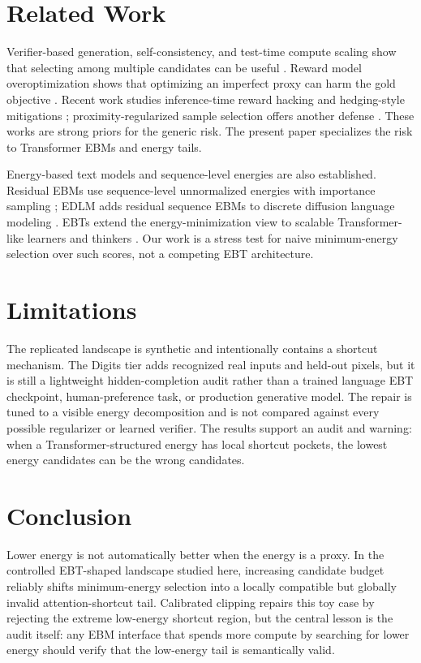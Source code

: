 \documentclass{article}
\begin{document}
\section{Related Work}

Verifier-based generation, self-consistency, and test-time compute scaling show
that selecting among multiple candidates can be useful
\citep{cobbe2021training,wang2023selfconsistency,snell2024scaling}. Reward
model overoptimization shows that optimizing an imperfect proxy can harm the
gold objective \citep{gao2023scaling}. Recent work studies inference-time
reward hacking and hedging-style mitigations \citep{khalaf2025inference};
proximity-regularized sample selection offers another defense
\citep{jinnai2024regularized}. These works are strong priors for the generic
risk. The present paper specializes the risk to Transformer EBMs and energy
tails.

Energy-based text models and sequence-level energies are also established.
Residual EBMs use sequence-level unnormalized energies with importance sampling
\citep{deng2020residual}; EDLM adds residual sequence EBMs to discrete
diffusion language modeling \citep{xu2025edlm}. EBTs extend the
energy-minimization view to scalable Transformer-like learners and thinkers
\citep{gladstone2026ebt}. Our work is a stress test for naive minimum-energy
selection over such scores, not a competing EBT architecture.

\section{Limitations}

The replicated landscape is synthetic and intentionally contains a shortcut
mechanism. The Digits tier adds recognized real inputs and held-out pixels, but
it is still a lightweight hidden-completion audit rather than a trained
language EBT checkpoint, human-preference task, or production generative model.
The repair is tuned to a visible energy decomposition and is not compared
against every possible regularizer or learned verifier. The results support an
audit and warning: when a Transformer-structured energy has local shortcut
pockets, the lowest energy candidates can be the wrong candidates.

\section{Conclusion}

Lower energy is not automatically better when the energy is a proxy. In the
controlled EBT-shaped landscape studied here, increasing candidate budget
reliably shifts minimum-energy selection into a locally compatible but globally
invalid attention-shortcut tail. Calibrated clipping repairs this toy case by
rejecting the extreme low-energy shortcut region, but the central lesson is the
audit itself: any EBM interface that spends more compute by searching for lower
energy should verify that the low-energy tail is semantically valid.
\end{document}
